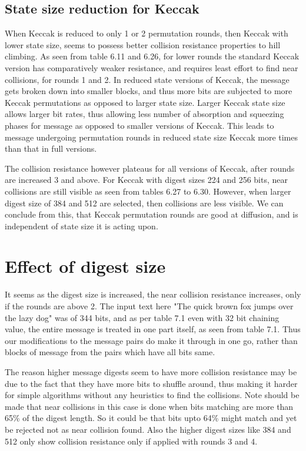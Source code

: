 \subsection{State size reduction for Keccak}

When Keccak is reduced to only 1 or 2 permutation rounds, then Keccak with lower state size, seems to possess better
collision resistance properties to hill climbing. As seen from table 6.11 and 6.26, for lower rounds the standard Keccak
version has comparatively weaker resistance, and requires least effort to find near collisions, for rounds 1 and 2.
In reduced state versions of Keccak, the message gets broken down into smaller blocks, and thus more bits are subjected
to more Keccak permutations as opposed to larger state size. Larger Keccak state size allows larger bit rates, thus
allowing less number of absorption and squeezing phases for message as opposed to smaller versions of Keccak. This
leads to message undergoing permutation rounds in reduced state size Keccak more times than that in full versions.

The collision resistance however plateaus for all versions of Keccak, after rounds are increased 3 and above. For Keccak
with digest sizes 224 and 256 bits, near collisions are still visible as seen from tables 6.27 to 6.30. However, when 
larger digest size of 384 and 512 are selected, then collisions are less visible. We can conclude from this, that
Keccak permutation rounds are good at diffusion, and is independent of state size it is acting upon.

\newpage

\section{Effect of digest size}

It seems as the digest size is increased, the near collision resistance increases, only if the rounds are above 2. The
input text here "The quick brown fox jumps over the lazy dog" was of 344 bits, and as per table 7.1 even with 32 bit
chaining value, the entire message is treated in one part itself, as seen from table 7.1. Thus our modifications to 
the message pairs do make it through in one go, rather than blocks of message from the pairs which have all bits same.

The reason higher message digests seem to have more collision resistance may be due to the fact that they have more
bits to shuffle around, thus making it harder for simple algorithms without any heuristics to find the collisions. Note
should be made that near collisions in this case is done when bits matching are more than 65\% of the digest length.
So it could be that bits upto 64\% might match and yet be rejected not as near collision found. Also the higher
digest sizes like 384 and 512 only show collision resistance only if applied with rounds 3 and 4.

